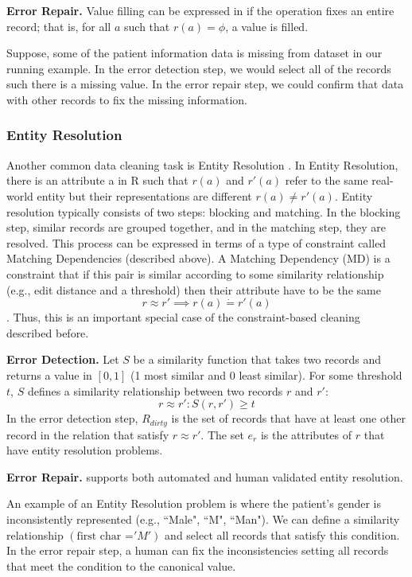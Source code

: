 \noindent\textbf{Error Repair. } Value filling can be expressed in \sys if the operation fixes an entire record; that is, for all $a$ such that $r(a) = \phi$, a value is filled.

\begin{example}
Suppose, some of the patient information data is missing from dataset in our running example.
In the error detection step, we would select all of the records such there is a missing value.
In the error repair step, we could confirm that data with other records to fix the missing information.
\end{example}

\subsubsection{Entity Resolution}
Another common data cleaning task is Entity Resolution \cite{gokhale2014corleone, DBLP:journals/pvldb/KopckeTR10}.
In Entity Resolution, there is an attribute a in R such that $r(a)$ and $r'(a)$ refer to the same real-world entity but their representations are different $r(a) \ne r'(a)$.
Entity resolution typically consists of two steps: blocking and matching.
In the blocking step, similar records are grouped together, and in the matching step, they are resolved.
This process can be expressed in terms of a type of constraint called Matching Dependencies (described above).
A Matching Dependency (MD) is a constraint that if this pair is similar according to some similarity relationship (e.g., edit distance and a threshold) then their attribute have to be the same
\[ r \approx r' \implies r(a) \dot{=} r'(a) \].
Thus, this is an important special case of the constraint-based cleaning described before.

\noindent\textbf{Error Detection. } Let $S$ be a similarity function that takes two records and returns a value in $[0,1]$ (1 most similar and 0 least similar). For some threshold $t$, $S$ defines a similarity relationship between two records $r$ and $r'$:
\[
r \approx r' : S(r,r') \ge t
\] 
In the error detection step, $R_{dirty}$ is the set of records that have at least one other record in the relation that satisfy $r \approx r'$.
The set $e_r$ is the attributes of $r$ that have entity resolution problems.

\noindent\textbf{Error Repair. } \sys supports both automated and human validated entity resolution.

\begin{example}
An example of an Entity Resolution problem is where the patient's gender is inconsistently represented (e.g., ``Male", ``M", ``Man"). 
We can define a similarity relationship $(\text{first char =} 'M')$ and select all records that satisfy this condition.
In the error repair step, a human can fix the inconsistencies setting all records that meet the condition to the canonical value.
\end{example}

